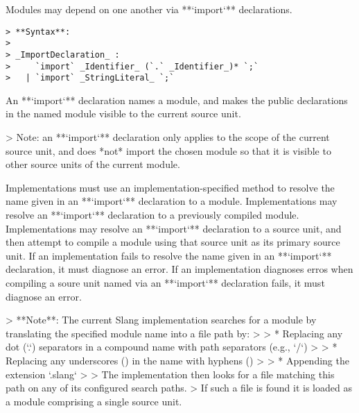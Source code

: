 Modules may depend on one another via **`import`** declarations.

\begin{verbatim}
> **Syntax**:
>
> _ImportDeclaration_ :
>     `import` _Identifier_ (`.` _Identifier_)* `;`
>   | `import` _StringLiteral_ `;`
\end{verbatim}

An **`import`** declaration names a module, and makes the public declarations in the named module visible to the current source unit.

> Note: an **`import`** declaration only applies to the scope of the current source unit, and does *not* import the chosen module so that it is visible to other source units of the current module.

Implementations must use an implementation-specified method to resolve the name given in an **`import`** declaration to a module.
Implementations may resolve an **`import`** declaration to a previously compiled module.
Implementations may resolve an **`import`** declaration to a source unit, and then attempt to compile a module using that source unit as its primary source unit.
If an implementation fails to resolve the name given in an **`import`** declaration, it must diagnose an error.
If an implementation diagnoses erros when compiling a soure unit named via an **`import`** declaration fails, it must diagnose an error.

> **Note**: The current Slang implementation searches for a module by translating the specified module name into a file path by:
>
> * Replacing any dot (`.`) separators in a compound name with path separators (e.g., `/`)
>
> * Replacing any underscores (\Char{_}) in the name with hyphens (\Char{-})
>
> * Appending the extension `.slang`
>
> The implementation then looks for a file matching this path on any of its configured search paths.
> If such a file is found it is loaded as a module comprising a single source unit.



























